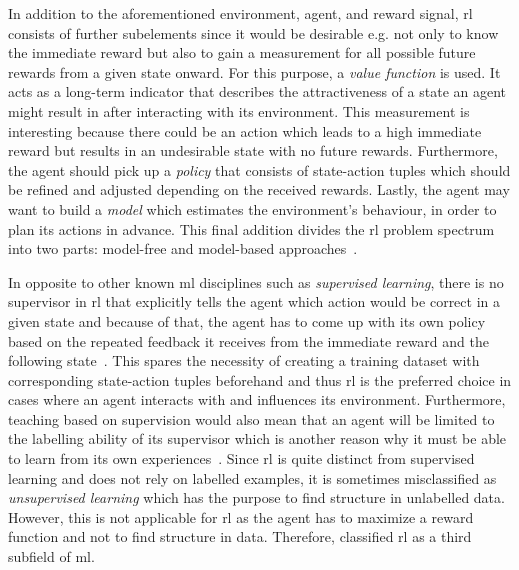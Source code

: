 \documentclass[draft,final]{vutinfth} %
\begin{document}
    In addition to the aforementioned environment, agent, and reward signal, \gls{rl} consists of further subelements since it would be desirable e.g. not only to know the immediate reward but also to gain a measurement for all possible future rewards from a given state onward.
    For this purpose, a \textit{value function} is used.
    It acts as a long-term indicator that describes the attractiveness of a state an agent might result in after interacting with its environment.
    This measurement is interesting because there could be an action which leads to a high immediate reward but results in an undesirable state with no future rewards.
    Furthermore, the agent should pick up a \textit{policy} that consists of state-action tuples which should be refined and adjusted depending on the received rewards.
    Lastly, the agent may want to build a \textit{model} which estimates the environment's behaviour, in order to plan its actions in advance.
    This final addition divides the \gls{rl} problem spectrum into two parts: model-free and model-based approaches~\citep{sutton_reinforcement_2018}.


    In opposite to other known \gls{ml} disciplines such as \textit{supervised learning}, there is no supervisor in \gls{rl} that explicitly tells the agent which action would be correct in a given state and because of that, the agent has to come up with its own policy based on the repeated feedback it receives from the immediate reward and the following state~\citep{kaelbling_reinforcement_1996}.
    This spares the necessity of creating a training dataset with corresponding state-action tuples beforehand and thus \gls{rl} is the preferred choice in cases where an agent interacts with and influences its environment.
    Furthermore, teaching based on supervision would also mean that an agent will be limited to the labelling ability of its supervisor which is another reason why it must be able to learn from its own experiences~.
    Since \gls{rl} is quite distinct from supervised learning and does not rely on labelled examples, it is sometimes misclassified as \textit{unsupervised learning} which has the purpose to find structure in unlabelled data.
    However, this is not applicable for \gls{rl} as the agent has to maximize a reward function and not to find structure in data.
    Therefore, \citeauthor{sutton_reinforcement_2018} classified \gls{rl}  as a third subfield of \gls{ml}.
\end{document}
